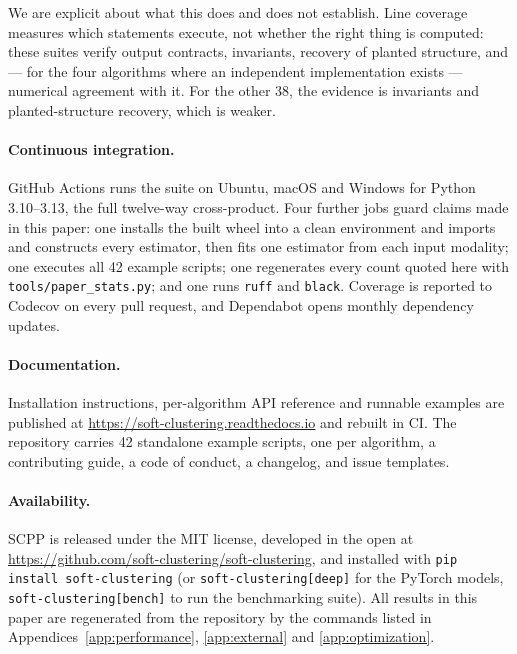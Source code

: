 \documentclass[twoside,11pt]{article}
\begin{document}
We are explicit about what this does and does not establish. Line coverage
measures which statements execute, not whether the right thing is computed:
these suites verify output contracts, invariants, recovery of planted
structure, and --- for the four algorithms where an independent
implementation exists --- numerical agreement with it. For the other 38, the
evidence is invariants and planted-structure recovery, which is weaker.

\paragraph{Continuous integration.} GitHub Actions runs the suite on Ubuntu,
macOS and Windows for Python 3.10--3.13, the full twelve-way cross-product.
Four further jobs guard claims made in this paper: one installs the built
wheel into a clean environment and imports and constructs every estimator,
then fits one estimator from each input modality; one executes all 42 example
scripts; one regenerates every count quoted here with
\texttt{tools/paper\_stats.py}; and one runs \texttt{ruff} and
\texttt{black}. Coverage is reported to Codecov on every pull request, and
Dependabot opens monthly dependency updates.

\paragraph{Documentation.} Installation instructions, per-algorithm API
reference and runnable examples are published at
\url{https://soft-clustering.readthedocs.io} and rebuilt in CI. The
repository carries 42 standalone example scripts, one per algorithm, a
contributing guide, a code of conduct, a changelog, and issue templates.

\paragraph{Availability.} SCPP is released under the MIT license, developed
in the open at \url{https://github.com/soft-clustering/soft-clustering}, and
installed with \texttt{pip install soft-clustering} (or
\texttt{soft-clustering[deep]} for the PyTorch models,
\texttt{soft-clustering[bench]} to run the benchmarking suite). All results
in this paper are regenerated from the repository by the commands listed in
Appendices~\ref{app:performance}, \ref{app:external} and
\ref{app:optimization}.

\end{document}
